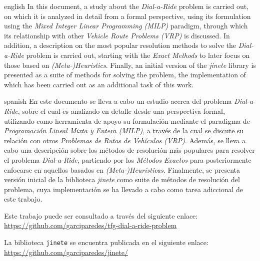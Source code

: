 \documentclass{subfiles}
\newenvironment{abstractpage}
  {\cleardoublepage\vspace*{\fill}\thispagestyle{empty}}
  {\vfill\cleardoublepage}
\newenvironment{abstract-lang}[1]
  {\bigskip\selectlanguage{#1}%
   \begin{center}\bfseries\abstractname\end{center}}
  {\par\bigskip}
\begin{document}
  \begin{abstractpage}
    \begin{abstract-lang}{english}
      In this document, a study about the \emph{Dial-a-Ride} problem is carried out, on which it is analyzed in detail from a formal perspective, using its formulation using the \emph{Mixed Integer Linear Programming (MILP)} paradigm, through which its relationship with other \emph{Vehicle Route Problems (VRP)} is discussed. In addition, a description on the most popular resolution methods to solve the \emph{Dial-a-Ride} problem is carried out, starting with the \emph{Exact Methods} to later focus on those based on \emph{(Meta-)Heuristics}. Finally, an initial version of the \emph{jinete} library is presented as a suite of methods for solving the problem, the implementation of which has been carried out as an additional task of this work.
    \end{abstract-lang}
    \begin{abstract-lang}{spanish}
      En este documento se lleva a cabo un estudio acerca del problema \emph{Dial-a-Ride}, sobre el cual es analizado en detalle desde una perspectiva formal, utilizando como herramienta de apoyo su formulación mediante el paradigma de \emph{Programación Lineal Mixta y Entera (MILP)}, a través de la cual se discute su relación con otros \emph{Problemas de Rutas de Vehículos (VRP)}. Además, se lleva a cabo una descripción sobre los métodos de resolución más populares para resolver el problema \emph{Dial-a-Ride}, partiendo por los \emph{Métodos Exactos} para posteriormente enfocarse en aquellos basados en \emph{(Meta-)Heurísticas}. Finalmente, se presenta versión inicial de la biblioteca \emph{jinete} como suite de métodos de resolución del problema, cuya implementación se ha llevado a cabo como tarea adiccional de este trabajo.
    \end{abstract-lang}

    \bigskip
    \centering
    Este trabajo puede ser consultado a través del siguiente enlace: \url{https://github.com/garciparedes/tfg-dial-a-ride-problem}

    \bigskip
    La biblioteca \texttt{jinete} se encuentra publicada en el siguiente enlace: \url{https://github.com/garciparedes/jinete/}

  \end{abstractpage}
\end{document}

